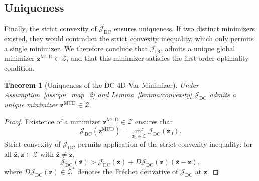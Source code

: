 \documentclass[final,1p,times]{elsarticle}
\newtheorem{theorem}{Theorem}[section]
\begin{document}
\subsection{Uniqueness}

Finally, the strict convexity of $ \mathcal{J}_{\mathrm{DC}} $ ensures uniqueness. 
If two distinct minimizers existed, they would contradict the strict convexity inequality, which only permits a single minimizer.
We therefore conclude that $ \mathcal{J}_{\mathrm{DC}} $ admits a unique global minimizer $ \mathbf{z}^{\mathrm{MUD}} \in \mathcal{Z} $, and that this minimizer satisfies the first-order optimality condition.

\begin{theorem}[Uniqueness of the DC 4D-Var Minimizer]
Under Assumption~\ref{ass:qoi_map_2} and Lemma~\ref{lemma:convexity} $\mathcal{J}_{\mathrm{DC}}$  admits a unique minimizer $ \mathbf{z}^{\text{MUD}} \in \mathcal{Z} $.    \label{thm:uniqueness}
\end{theorem}
\begin{proof}
Existence of a minimizer $ \mathbf{z}^{\text{MUD}} \in \mathcal{Z} $ ensures that
\begin{equation}
\mathcal{J}_{\mathrm{DC}}(\mathbf{z}^{\text{MUD}}) = \inf_{\mathbf{z}_0 \in \mathcal{Z}} \mathcal{J}_{\mathrm{DC}}(\mathbf{z}_0).
\end{equation}
Strict convexity of $ \mathcal{J}_{\mathrm{DC}} $ permits application of the strict convexity inequality: for all $ \bar{\mathbf{z}}, \mathbf{z} \in \mathcal{Z} $ with $ \bar{\mathbf{z}} \neq \mathbf{z} $,
\begin{equation}
\mathcal{J}_{\mathrm{DC}}(\bar{\mathbf{z}}) > \mathcal{J}_{\mathrm{DC}}(\mathbf{z}) + D\mathcal{J}_{\mathrm{DC}}(\mathbf{z})\left(\bar{\mathbf{z}} - \mathbf{z}\right),
\end{equation}
where $ D\mathcal{J}_{\mathrm{DC}}(\mathbf{z}) \in \mathcal{Z}^* $ denotes the Fréchet derivative of $ \mathcal{J}_{\mathrm{DC}} $ at $ \mathbf{z} $.

\end{proof}
\end{document}
